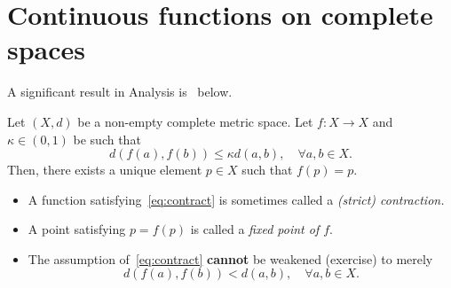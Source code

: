 \section{Continuous functions on complete spaces}
\label{sec:comp_cts}
A significant result in Analysis is~ below.
\begin{thm}
	\label{thm:banach}
	Let $(X,d)$ be a non-empty complete metric space. Let $f:X\to X$ and $\kappa \in (0,1)$ be such that
	\begin{equation}
		\label{eq:contract}
		d(f(a),f(b))\le \kappa d(a,b),\quad \forall a,b\in X.
	\end{equation}
	Then, there exists a unique element $p\in X$ such that $f(p) = p$.
\end{thm}
\begin{rem}
	\begin{itemize}
		\item A function satisfying~\eqref{eq:contract} is sometimes called a \textit{(strict) contraction.}
		\item A point satisfying $p = f(p)$ is called a \textit{fixed point of $f$}.
		\item The assumption of~\eqref{eq:contract} \textbf{cannot} be weakened (exercise) to merely
		\[
		d(f(a),f(b))<d(a,b),\quad \forall a,b\in X.
		\]
	\end{itemize}
\end{rem}
